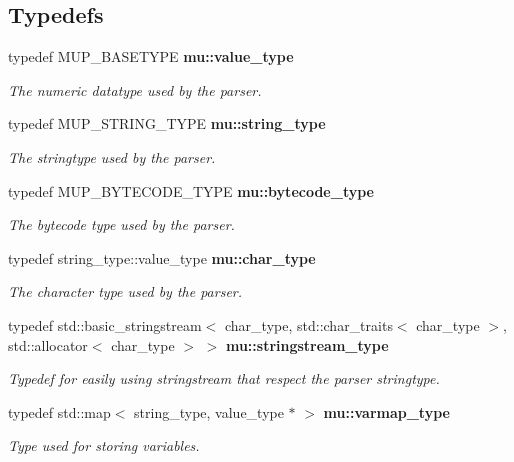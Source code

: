 \subsection*{Typedefs}
\begin{CompactItemize}
\item 
typedef MUP\_\-BASETYPE {\bf mu::value\_\-type}
\begin{CompactList}\small\item\em The numeric datatype used by the parser. \item\end{CompactList}\item 
typedef MUP\_\-STRING\_\-TYPE {\bf mu::string\_\-type}
\begin{CompactList}\small\item\em The stringtype used by the parser. \item\end{CompactList}\item 
typedef MUP\_\-BYTECODE\_\-TYPE {\bf mu::bytecode\_\-type}
\begin{CompactList}\small\item\em The bytecode type used by the parser. \item\end{CompactList}\item 
typedef string\_\-type::value\_\-type {\bf mu::char\_\-type}
\begin{CompactList}\small\item\em The character type used by the parser. \item\end{CompactList}\item 
typedef std::basic\_\-stringstream$<$ char\_\-type, std::char\_\-traits$<$ char\_\-type $>$, std::allocator$<$ char\_\-type $>$ $>$ {\bf mu::stringstream\_\-type}
\begin{CompactList}\small\item\em Typedef for easily using stringstream that respect the parser stringtype. \item\end{CompactList}\item 
typedef std::map$<$ string\_\-type, value\_\-type $\ast$ $>$ {\bf mu::varmap\_\-type}
\begin{CompactList}\small\item\em Type used for storing variables. \item\end{CompactList}\item 

\end{CompactItemize}
